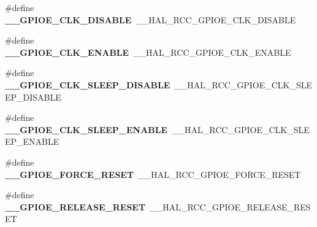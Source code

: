 \begin{DoxyCompactItemize}
\item 
\hypertarget{group___h_a_l___r_c_c___aliased_ga8181ceafa56a5eb16680e0fe30bb5fe1}{\#define {\bfseries \-\_\-\-\_\-\-G\-P\-I\-O\-E\-\_\-\-C\-L\-K\-\_\-\-D\-I\-S\-A\-B\-L\-E}~\-\_\-\-\_\-\-H\-A\-L\-\_\-\-R\-C\-C\-\_\-\-G\-P\-I\-O\-E\-\_\-\-C\-L\-K\-\_\-\-D\-I\-S\-A\-B\-L\-E}\label{group___h_a_l___r_c_c___aliased_ga8181ceafa56a5eb16680e0fe30bb5fe1}

\item 
\hypertarget{group___h_a_l___r_c_c___aliased_ga3dc0f8e57701da6357860c08670c1898}{\#define {\bfseries \-\_\-\-\_\-\-G\-P\-I\-O\-E\-\_\-\-C\-L\-K\-\_\-\-E\-N\-A\-B\-L\-E}~\-\_\-\-\_\-\-H\-A\-L\-\_\-\-R\-C\-C\-\_\-\-G\-P\-I\-O\-E\-\_\-\-C\-L\-K\-\_\-\-E\-N\-A\-B\-L\-E}\label{group___h_a_l___r_c_c___aliased_ga3dc0f8e57701da6357860c08670c1898}

\item 
\hypertarget{group___h_a_l___r_c_c___aliased_ga6aed41e94b90a11cbe6c4798ee3b3b9a}{\#define {\bfseries \-\_\-\-\_\-\-G\-P\-I\-O\-E\-\_\-\-C\-L\-K\-\_\-\-S\-L\-E\-E\-P\-\_\-\-D\-I\-S\-A\-B\-L\-E}~\-\_\-\-\_\-\-H\-A\-L\-\_\-\-R\-C\-C\-\_\-\-G\-P\-I\-O\-E\-\_\-\-C\-L\-K\-\_\-\-S\-L\-E\-E\-P\-\_\-\-D\-I\-S\-A\-B\-L\-E}\label{group___h_a_l___r_c_c___aliased_ga6aed41e94b90a11cbe6c4798ee3b3b9a}

\item 
\hypertarget{group___h_a_l___r_c_c___aliased_gadc6371db865d9313fbe560c6f25e0768}{\#define {\bfseries \-\_\-\-\_\-\-G\-P\-I\-O\-E\-\_\-\-C\-L\-K\-\_\-\-S\-L\-E\-E\-P\-\_\-\-E\-N\-A\-B\-L\-E}~\-\_\-\-\_\-\-H\-A\-L\-\_\-\-R\-C\-C\-\_\-\-G\-P\-I\-O\-E\-\_\-\-C\-L\-K\-\_\-\-S\-L\-E\-E\-P\-\_\-\-E\-N\-A\-B\-L\-E}\label{group___h_a_l___r_c_c___aliased_gadc6371db865d9313fbe560c6f25e0768}

\item 
\hypertarget{group___h_a_l___r_c_c___aliased_gafdfb826bee2c22e04ac51953aeaf3d17}{\#define {\bfseries \-\_\-\-\_\-\-G\-P\-I\-O\-E\-\_\-\-F\-O\-R\-C\-E\-\_\-\-R\-E\-S\-E\-T}~\-\_\-\-\_\-\-H\-A\-L\-\_\-\-R\-C\-C\-\_\-\-G\-P\-I\-O\-E\-\_\-\-F\-O\-R\-C\-E\-\_\-\-R\-E\-S\-E\-T}\label{group___h_a_l___r_c_c___aliased_gafdfb826bee2c22e04ac51953aeaf3d17}

\item 
\hypertarget{group___h_a_l___r_c_c___aliased_ga08a018573715830069dc9273ca69e856}{\#define {\bfseries \-\_\-\-\_\-\-G\-P\-I\-O\-E\-\_\-\-R\-E\-L\-E\-A\-S\-E\-\_\-\-R\-E\-S\-E\-T}~\-\_\-\-\_\-\-H\-A\-L\-\_\-\-R\-C\-C\-\_\-\-G\-P\-I\-O\-E\-\_\-\-R\-E\-L\-E\-A\-S\-E\-\_\-\-R\-E\-S\-E\-T}\label{group___h_a_l___r_c_c___aliased_ga08a018573715830069dc9273ca69e856}


\end{DoxyCompactItemize}
